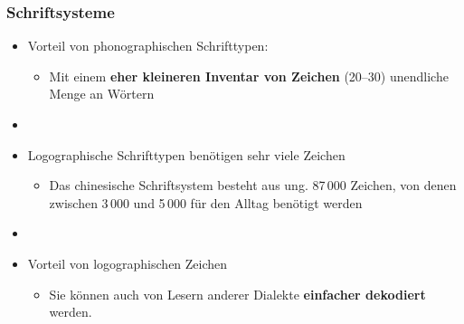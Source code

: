 \begin{frame}
\frametitle{Schriftsysteme}

\begin{itemize}
	\item Vorteil von phonographischen Schrifttypen:
	
	\begin{itemize}
		\item Mit einem \textbf{eher kleineren Inventar von Zeichen} (20--30) \ras unendliche Menge an Wörtern
	\end{itemize}
	
	\item[]
	\item Logographische Schrifttypen benötigen sehr viele Zeichen
	
	\begin{itemize}
		\item Das chinesische Schriftsystem besteht aus ung. 87\,000 Zeichen, von denen zwischen 3\,000 und 5\,000 für den Alltag benötigt werden
	\end{itemize}
	
	\item[]
	\item Vorteil von logographischen Zeichen
	\begin{itemize}
		\item Sie können auch von Lesern anderer Dialekte \textbf{einfacher dekodiert} werden.
	\end{itemize}	
\end{itemize}
\end{frame}



